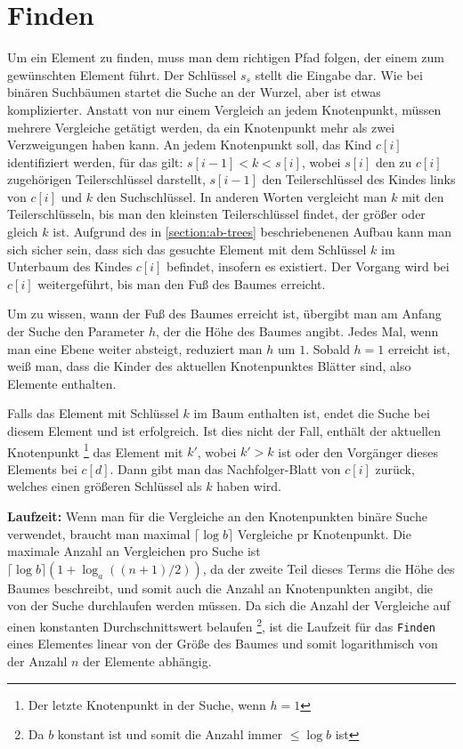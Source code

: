 \section{Finden}
\label{section:locate}

Um ein Element zu finden, muss man dem richtigen Pfad folgen, der einem zum gewünschten Element führt. Der Schlüssel $s_s$ stellt die Eingabe dar. Wie bei binären Suchbäumen startet die Suche an der Wurzel, aber ist etwas komplizierter. Anstatt von nur einem Vergleich an jedem Knotenpunkt, müssen mehrere Vergleiche getätigt werden, da ein Knotenpunkt mehr als zwei Verzweigungen haben kann. An jedem Knotenpunkt soll, das Kind $c[i]$ identifiziert werden, für das gilt: $s[i-1] < k < s[i]$, wobei $s[i]$ den zu $c[i]$ zugehörigen Teilerschlüssel darstellt, $s[i-1]$ den Teilerschlüssel des Kindes links von $c[i]$ und $k$ den Suchschlüssel. In anderen Worten vergleicht man $k$ mit den Teilerschlüsseln, bis man den kleinsten Teilerschlüssel findet, der größer oder gleich $k$ ist. Aufgrund des in \autoref{section:ab-trees} beschriebenenen Aufbau kann man sich sicher sein, dass sich das gesuchte Element mit dem Schlüssel $k$ im Unterbaum des Kindes $c[i]$ befindet, insofern es existiert. Der Vorgang wird bei $c[i]$ weitergeführt, bis man den Fuß des Baumes erreicht.
\par
Um zu wissen, wann der Fuß des Baumes erreicht ist, übergibt man am Anfang der Suche den Parameter $h$, der die Höhe des Baumes angibt. Jedes Mal, wenn man eine Ebene weiter absteigt, reduziert man $h$ um $1$. Sobald $h = 1$ erreicht ist, weiß man, dass die Kinder des aktuellen Knotenpunktes Blätter sind, also Elemente enthalten.
\par
Falls das Element mit Schlüssel $k$ im Baum enthalten ist, endet die Suche bei diesem Element und ist erfolgreich. Ist dies nicht der Fall, enthält der aktuellen Knotenpunkt \footnote{Der letzte Knotenpunkt in der Suche, wenn $h = 1$} das Element mit $k'$, wobei $k' > k$ ist oder den Vorgänger dieses Elements bei $c[d]$. Dann gibt man das Nachfolger-Blatt von $c[i]$ zurück, welches einen größeren Schlüssel als $k$ haben wird.
\par
\textbf{Laufzeit: } Wenn man für die Vergleiche an den Knotenpunkten binäre Suche verwendet, braucht man maximal $\lceil \log b \rceil$ Vergleiche pr Knotenpunkt. Die maximale Anzahl an Vergleichen pro Suche ist $\lceil \log b \rceil (1+\log_a((n+1)/2))$, da der zweite Teil dieses Terms die Höhe des Baumes beschreibt, und somit auch die Anzahl an Knotenpunkten angibt, die von der Suche durchlaufen werden müssen. Da sich die Anzahl der Vergleiche auf einen konstanten Durchschnittswert belaufen \footnote{Da $b$ konstant ist und somit die Anzahl immer $\leq \log b$ ist}, ist die Laufzeit für das \texttt{Finden} eines Elementes linear von der Größe des Baumes und somit logarithmisch von der Anzahl $n$ der Elemente abhängig.\\
\cite{Sanders:19}

